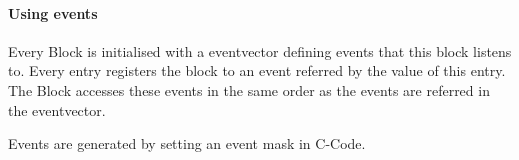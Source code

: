 \documentclass[%
	pdftex,%
	a4paper,%
	oneside,%
	11pt,%
	halfparskip,%
	headsepline,%
	bibtotocnumbered,%
	idxtotoc%
]{scrartcl}
\begin{document}
\paragraph{Using events}

Every Block is initialised with a eventvector defining events that this block listens to. Every entry registers the block to an event referred by the value of this entry. The Block accesses these events in the same order as the events are referred in the eventvector. 


Events are generated by setting an event mask in C-Code.



% 
% 
% 
% 
% 
% 
% 
\end{document}
